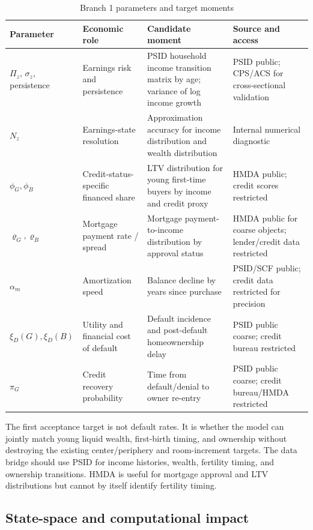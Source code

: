 \documentclass[11pt]{article}
\begin{document}
\begin{table}[!ht]
\centering
\caption{Branch 1 parameters and target moments}
\begin{tabular}{p{}p{}p{}p{}}
\toprule
Parameter & Economic role & Candidate moment & Source and access \\
\midrule
$\Pi_z$, $\sigma_z$, persistence & Earnings risk and persistence & PSID household income transition matrix by age; variance of log income growth & PSID public; CPS/ACS for cross-sectional validation \\
$N_z$ & Earnings-state resolution & Approximation accuracy for income distribution and wealth distribution & Internal numerical diagnostic \\
$\phi_G,\phi_B$ & Credit-status-specific financed share & LTV distribution for young first-time buyers by income and credit proxy & HMDA public; credit scores restricted \\
$\varrho_G,\varrho_B$ & Mortgage payment rate / spread & Mortgage payment-to-income distribution by approval status & HMDA public for coarse objects; lender/credit data restricted \\
$\alpha_m$ & Amortization speed & Balance decline by years since purchase & PSID/SCF public; credit data restricted for precision \\
$\xi_D(G),\xi_D(B)$ & Utility and financial cost of default & Default incidence and post-default homeownership delay & PSID public coarse; credit bureau restricted \\
$\pi_G$ & Credit recovery probability & Time from default/denial to owner re-entry & PSID public coarse; credit bureau/HMDA restricted \\
\bottomrule
\end{tabular}
\end{table}

The first acceptance target is not default rates. It is whether the model can jointly match young liquid wealth, first-birth timing, and ownership without destroying the existing center/periphery and room-increment targets. The data bridge should use PSID for income histories, wealth, fertility timing, and ownership transitions. HMDA is useful for mortgage approval and LTV distributions but cannot by itself identify fertility timing.

\subsection{State-space and computational impact}
\end{document}
